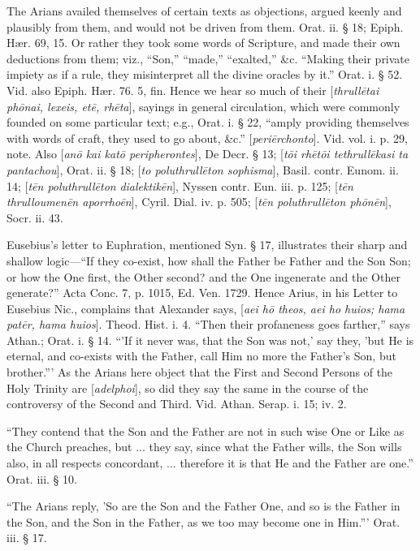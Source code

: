 The Arians availed themselves of certain texts as
objections, argued keenly and plausibly from them, and would not be
driven from them. Orat. ii. § 18; Epiph. Hær. 69, 15. Or rather they
took some words of Scripture, and made their own deductions from them;
viz., ``Son,'' ``made,'' ``exalted,'' \&c. ``Making their private impiety
as if a rule, they misinterpret all the divine oracles by it.'' Orat. i.
§ 52. Vid. also Epiph. Hær. 76. 5, fin. Hence we hear so much of
their [\emph{thrull\={e}tai ph\={o}nai, lexeis, et\={e}, rh\={e}ta}],
sayings in general circulation, which were commonly founded on some
particular text; e.g., Orat. i. § 22, ``amply providing themselves
with words of craft, they used to go about, \&c.'' [\emph{peri\={e}rchonto}].
Vid. vol. i. p. 29, note. Also [\emph{an\={o} kai kat\={o}
peripherontes}], De Decr. § 13; [\emph{t\={o}i rh\={e}t\={o}i
tethrull\={e}kasi ta pantachou}], Orat. ii. § 18; [\emph{to
poluthrull\={e}ton sophisma}], Basil. contr. Eunom. ii. 14; [\emph{t\={e}n
poluthrull\={e}ton} \emph{dialektik\={e}n}], Nyssen contr.
Eun. iii. p. 125; [\emph{t\={e}n thrulloumen\={e}n aporrho\={e}n}],
Cyril. Dial. iv. p. 505; [\emph{t\={e}n poluthrull\={e}ton ph\={o}n\={e}n}],
Socr. ii. 43.

Eusebius's letter to Euphration, mentioned Syn.
§ 17, illustrates their sharp and shallow logic—``If they co-exist, how shall the Father be Father and the Son Son; or how the
One first, the Other second? and the One ingenerate and the Other
generate?'' Acta Conc. 7, p. 1015, Ed. Ven. 1729. Hence Arius, in his
Letter to Eusebius Nic., complains that Alexander says, [\emph{aei h\={o}
theos, aei ho huios; hama pat\={e}r, hama huios}]. Theod. Hist.
i. 4. ``Then their profaneness goes farther,'' says Athan.; Orat. i. §
14. ``'If it never was, that the Son was not,' say they, 'but He is
eternal, and co-exists with the Father, call Him no more the Father's
Son, but brother.''' As the Arians here object that the First and
Second Persons of the Holy Trinity are [\emph{adelphoi}], so did they
say the same in the course of the controversy of the Second and Third.
Vid. Athan. Serap. i. 15; iv. 2.

``They contend that the Son and the Father are not
in such wise One or Like as the Church preaches, but ... they say,
since what the Father wills, the Son wills also, in all respects
concordant, ... therefore it is that He and the Father are one.'' Orat.
iii. § 10.

``The Arians reply, 'So are the Son and the Father
One, and so is the Father in the Son, and the Son in the Father, as we
too may become one in Him.''' Orat. iii. § 17.

